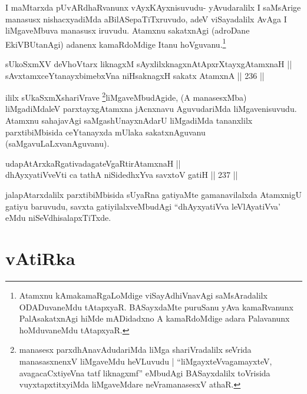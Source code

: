 \begin{artha}
I maMtarxda pUvARdhaRvanunx vAyxKAyxnisuvudu- yAvudaralilx I
saMsArige manasusx nishacxyadiMda aBilASepaTiTxruvudo, adeV
viSayadalilx AvAga I liMgaveMbuva manasusx iruvudu. Atamxnu sakatxnAgi
(adroDane EkiVBUtanAgi) adanenx kamaRdoMdige Itanu
hoVguvanu.\footnote{Atamxnu kAmakamaRgaLoMdige viSayAdhiVnavAgi
saMsAradalilx ODADuvaneMdu tAtapxyaR. BASayxdaMte puruSanu yAva
kamaRvanunx PalAsakatxnAgi hiMde mADidadxno A kamaRdoMdige adara
Palavanunx hoMduvaneMdu tAtapxyaR.}
\end{artha}


\begin{shl}
sUkoSxmXV deVhoV\s tarx liknagxM sAyxlilxknagxnAtApxrXtayxgAtamxnaH || \\
sAvxtamxceYtanayxbimebxVna niHsaknagxH sakatx AtamxnA ||  236 ||  
\end{shl}

\begin{artha}
ililx sUkaSxmXshariVrave \footnote{manasesx parxdhAnavAdudariMda liMga
shariVradalilx seVrida manasasxnenxV liMgaveMdu heVLuvudu |
``liMgayxteV\s vagamayxteV, avagacaCxtiyeVna tatf liknagxmf'' eMbudAgi BASayxdalilx toVrisida vuyxtapxtitxyiMda
liMgaveMdare neVramanasesxV athaR.}liMgaveMbudAgide, (A manasesxMba)
liMgadiMdaleV parxtayxgAtamxna jAcnxnavu AguvudariMda liMgavenisuvudu.
Atamxnu sahajavAgi saMgashUnayxnAdarU liMgadiMda tananxlilx
parxtibiMbisida ceYtanayxda mUlaka sakatxnAguvanu
(saMgavuLaLxvanAguvanu).
\end{artha}


\begin{shl}
udapAtArxkaRgativadagateVgaRtirAtamxnaH || \\
dhAyxyatiVveVti ca tathA niSidedhxYva savxtoV gatiH ||  237 ||  
\end{shl}

\begin{artha}
jalapAtarxdalilx parxtibiMbisida sUyaRna gatiyaMte gamanavilalxda
AtamxnigU gatiyu baruvudu, savxta gatiyilalxveMbudAgi ``dhAyxyatiVva
leVlAyatiVva' eMdu niSeVdhisalapxTiTxde.
\end{artha}

\section*{vAtiRka}

